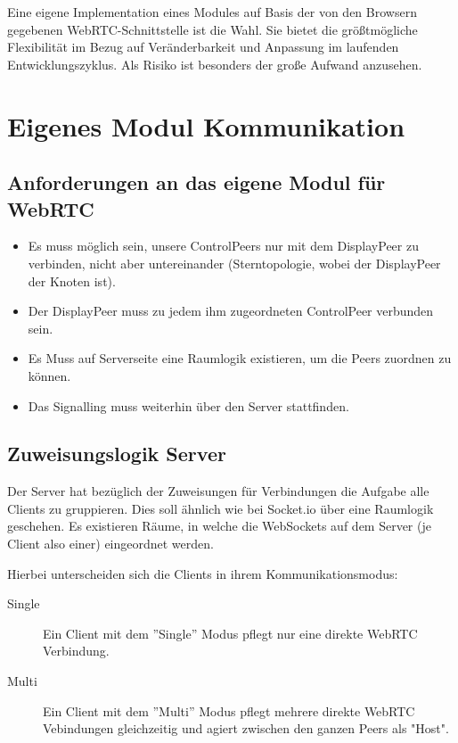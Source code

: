 Eine eigene Implementation eines Modules auf Basis der von den Browsern gegebenen WebRTC-Schnittstelle ist die Wahl. 
Sie bietet die größtmögliche Flexibilität im Bezug auf Veränderbarkeit und Anpassung im laufenden Entwicklungszyklus. 
Als Risiko ist besonders der große Aufwand anzusehen.



\section{Eigenes Modul Kommunikation}

\subsection{Anforderungen an das eigene Modul für WebRTC}
\begin{itemize}
\item 
Es muss möglich sein, unsere ControlPeers nur mit dem DisplayPeer zu verbinden, 
nicht aber untereinander (Sterntopologie, wobei der DisplayPeer der Knoten ist).

\item
Der DisplayPeer muss zu jedem ihm zugeordneten ControlPeer verbunden sein.

\item
Es Muss auf Serverseite eine Raumlogik existieren, um die Peers zuordnen zu 
können.

\item
Das Signalling muss weiterhin über den Server stattfinden.
\end{itemize}



\subsection{Zuweisungslogik Server}
Der Server hat bezüglich der Zuweisungen für Verbindungen die Aufgabe alle 
Clients zu gruppieren. Dies soll ähnlich wie bei Socket.io über eine Raumlogik 
geschehen. Es existieren Räume, in welche die WebSockets auf dem Server (je Client 
also einer) eingeordnet werden.


Hierbei unterscheiden sich die Clients in ihrem Kommunikationsmodus:
\begin{description}
\item[Single]
Ein Client mit dem ''Single'' Modus pflegt nur eine direkte WebRTC Verbindung.

\item[Multi]
Ein Client mit dem ''Multi'' Modus pflegt mehrere direkte WebRTC Vebindungen 
gleichzeitig und agiert zwischen den ganzen Peers als "Host".
\end{description}

